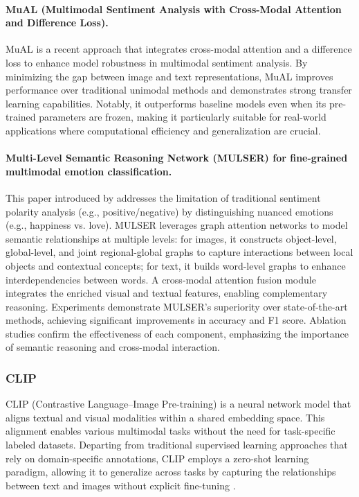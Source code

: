\paragraph{MuAL (Multimodal Sentiment Analysis with Cross-Modal Attention and Difference Loss).}
MuAL \cite{deng_mual_2024} is a recent approach that integrates cross-modal attention and a difference loss to enhance model robustness in multimodal sentiment analysis. By minimizing the gap between image and text representations, MuAL improves performance over traditional unimodal methods and demonstrates strong transfer learning capabilities. Notably, it outperforms baseline models even when its pre-trained parameters are frozen, making it particularly suitable for real-world applications where computational efficiency and generalization are crucial.

\paragraph{Multi-Level Semantic Reasoning Network (MULSER) for fine-grained multimodal emotion classification.} This paper introduced by \citet{9920172} addresses the limitation of traditional sentiment polarity analysis (e.g., positive/negative) by distinguishing nuanced emotions (e.g., happiness vs. love). MULSER leverages graph attention networks to model semantic relationships at multiple levels: for images, it constructs object-level, global-level, and joint regional-global graphs to capture interactions between local objects and contextual concepts; for text, it builds word-level graphs to enhance interdependencies between words. A cross-modal attention fusion module integrates the enriched visual and textual features, enabling complementary reasoning. Experiments demonstrate MULSER's superiority over state-of-the-art methods, achieving significant improvements in accuracy and F1 score. Ablation studies confirm the effectiveness of each component, emphasizing the importance of semantic reasoning and cross-modal interaction.


\subsubsection*{CLIP}
CLIP (Contrastive Language–Image Pre-training) is a neural network model that aligns textual and visual modalities within a shared embedding space. This alignment enables various multimodal tasks without the need for task-specific labeled datasets. Departing from traditional supervised learning approaches that rely on domain-specific annotations, CLIP employs a zero-shot learning paradigm, allowing it to generalize across tasks by capturing the relationships between text and images without explicit fine-tuning \cite{radford2021learningtransferablevisualmodels}.
\newline

